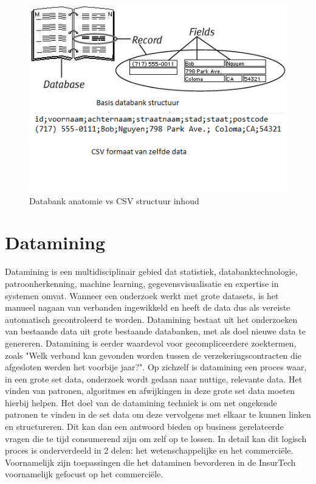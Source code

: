 \begin{figure}[!ht]
	\centering
	\includegraphics[width=\textwidth, height=\textheight, keepaspectratio]{databank_vs_CSV}
	\caption{Databank anatomie\cite{Hester2006} vs CSV structuur inhoud}
\end{figure}

\section{Datamining}

Datamining is een multidisciplinair gebied dat statistiek, databanktechnologie, patroonherkenning, machine learning, gegevensvisualisatie en expertise in systemen omvat.
Wanneer een onderzoek werkt met grote datasets, is het manueel nagaan van verbanden ingewikkeld en heeft de data dus als vereiste automatisch gecontroleerd te worden.
Datamining bestaat uit het onderzoeken van bestaande data uit grote bestaande databanken, met als doel nieuwe data te genereren. Datamining is eerder waardevol voor gecompliceerdere zoektermen, zoals "Welk verband kan gevonden worden tussen de verzekeringscontracten die afgesloten werden het voorbije jaar?".
Op zichzelf is datamining een proces waar, in een grote set data, onderzoek wordt gedaan naar nuttige, relevante data. Het vinden van patronen, algoritmes en afwijkingen in deze grote set data moeten hierbij helpen. Het doel van de datamining techniek is om net ongekende patronen te vinden in de set data om deze vervolgens met elkaar te kunnen linken en structureren. Dit kan dan een antwoord bieden op business gerelateerde vragen die te tijd consumerend zijn om zelf op te lossen. \autocite{osman2019data} In detail kan dit logisch proces is onderverdeeld in 2 delen: het wetenschappelijke en het commerciële. Voornamelijk zijn toepassingen die het dataminen bevorderen in de InsurTech voornamelijk gefocust op het commerciële. \autocite{hand2007principles}


